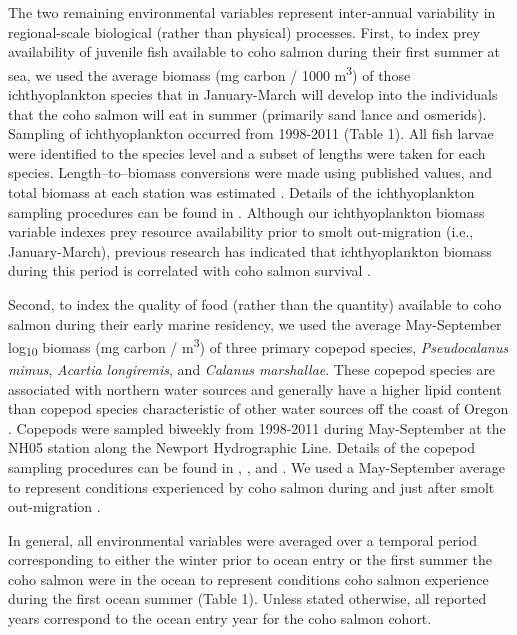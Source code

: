 The two remaining environmental variables represent inter-annual variability in
regional-scale biological (rather than physical) processes. First, to index prey
availability of juvenile fish available to coho salmon during their first summer
at sea, we used the average biomass (mg carbon / 1000 m\textsuperscript{3}) of
those ichthyoplankton species that in January-March will develop into the
individuals that the coho salmon will eat in summer (primarily sand lance and
osmerids).  Sampling of ichthyoplankton occurred from 1998-2011 (Table 1). All
fish larvae were identified to the species level and a subset of lengths were
taken for each species. Length--to--biomass conversions were made using
published values, and total biomass at each station was estimated
\citep{Peterson2012a}. Details of the ichthyoplankton sampling procedures can be
found in \citet{Daly2013}. Although our ichthyoplankton biomass variable indexes
prey resource availability prior to smolt out-migration (i.e., January-March),
previous research has indicated that ichthyoplankton biomass during this period
is correlated with coho salmon survival \citep{Daly2013}.

Second, to index the quality of food (rather than the quantity) available to
coho salmon during their early marine residency, we used the average
May-September log\textsubscript{10} biomass (mg carbon / m\textsuperscript{3})
of three primary copepod species, \emph{Pseudocalanus mimus}, \emph{Acartia
longiremis}, and \emph{Calanus marshallae}. These copepod species are associated
with northern water sources and generally have a higher lipid content than
copepod species characteristic of other water sources off the coast of Oregon
\citep{Lee2006, Hooff2006a}. Copepods were sampled biweekly from 1998-2011
during May-September at the NH05 station along the Newport Hydrographic Line.
Details of the copepod sampling procedures can be found in \citet{Lamb2005a},
\citet{Peterson2003a}, and \citet{Bi2011b}.  We used a May-September average to
represent conditions experienced by coho salmon during and just after smolt
out-migration \citep{Bi2011a}.

In general, all environmental variables were averaged over a temporal period
corresponding to either the winter prior to ocean entry or the first summer the
coho salmon were in the ocean to represent conditions coho salmon experience
during the first ocean summer (Table 1). Unless stated otherwise, all reported
years correspond to the ocean entry year for the coho salmon cohort.


